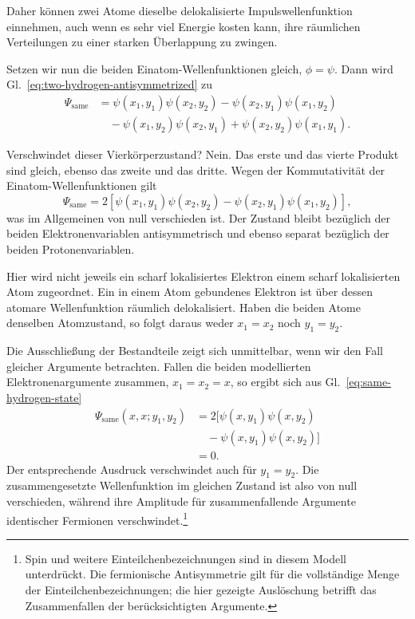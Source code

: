 Daher können zwei Atome dieselbe delokalisierte Impulswellenfunktion einnehmen, auch wenn es sehr viel Energie kosten kann, ihre räumlichen Verteilungen zu einer starken Überlappung zu zwingen.

Setzen wir nun die beiden Einatom-Wellenfunktionen gleich, \(\phi=\psi\). Dann wird Gl.~\eqref{eq:two-hydrogen-antisymmetrized} zu
\begin{align}
\Psi_{\mathrm{same}}
&=\psi(x_1,y_1)\psi(x_2,y_2)
-\psi(x_2,y_1)\psi(x_1,y_2)\nonumber\\
&\quad
-\psi(x_1,y_2)\psi(x_2,y_1)
+\psi(x_2,y_2)\psi(x_1,y_1).
\end{align}

Verschwindet dieser Vierkörperzustand? Nein. Das erste und das vierte Produkt sind gleich, ebenso das zweite und das dritte. Wegen der Kommutativität der Einatom-Wellenfunktionen gilt
\begin{equation}
\Psi_{\mathrm{same}}
=
2\left[
\psi(x_1,y_1)\psi(x_2,y_2)
-\psi(x_2,y_1)\psi(x_1,y_2)
\right],
\label{eq:same-hydrogen-state}
\end{equation}
was im Allgemeinen von null verschieden ist. Der Zustand bleibt bezüglich der beiden Elektronenvariablen antisymmetrisch und ebenso separat bezüglich der beiden Protonenvariablen.

Hier wird nicht jeweils ein scharf lokalisiertes Elektron einem scharf lokalisierten Atom zugeordnet. Ein in einem Atom gebundenes Elektron ist über dessen atomare Wellenfunktion räumlich delokalisiert. Haben die beiden Atome denselben Atomzustand, so folgt daraus weder \(x_1=x_2\) noch \(y_1=y_2\).

Die Ausschließung der Bestandteile zeigt sich unmittelbar, wenn wir den Fall gleicher Argumente betrachten. Fallen die beiden modellierten Elektronenargumente zusammen, \(x_1=x_2=x\), so ergibt sich aus Gl.~\eqref{eq:same-hydrogen-state}
\begin{align}
\Psi_{\mathrm{same}}(x,x;y_1,y_2)
&=2\bigl[
\psi(x,y_1)\psi(x,y_2)\nonumber\\
&\quad{}-\psi(x,y_1)\psi(x,y_2)
\bigr]\\
&=0.
\end{align}
Der entsprechende Ausdruck verschwindet auch für \(y_1=y_2\). Die zusammengesetzte Wellenfunktion im gleichen Zustand ist also von null verschieden, während ihre Amplitude für zusammenfallende Argumente identischer Fermionen verschwindet.\footnote{Spin und weitere Einteilchenbezeichnungen sind in diesem Modell unterdrückt. Die fermionische Antisymmetrie gilt für die vollständige Menge der Einteilchenbezeichnungen; die hier gezeigte Auslöschung betrifft das Zusammenfallen der berücksichtigten Argumente.}

